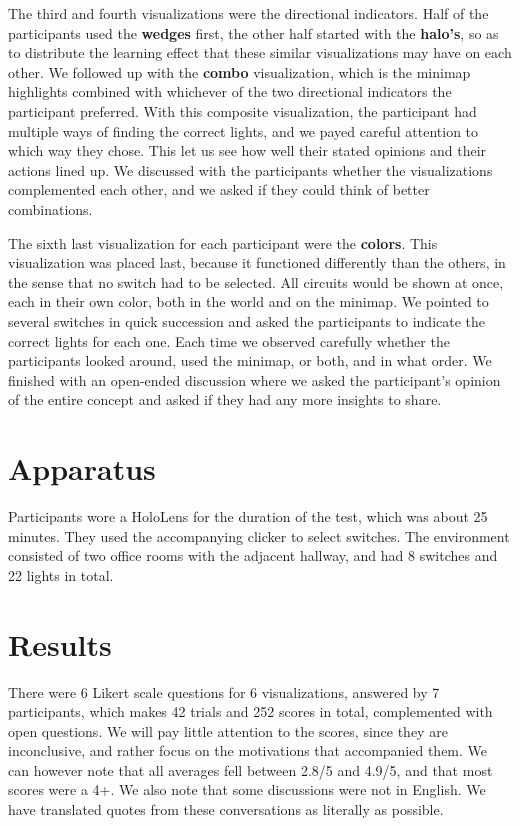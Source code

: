 The third and fourth visualizations were the directional indicators. Half of the participants used the \textbf{wedges} first, the other half started with the \textbf{halo's}, so as to distribute the learning effect that these similar visualizations may have on each other. We followed up with the \textbf{combo} visualization, which is the minimap highlights combined with whichever of the two directional indicators the participant preferred. With this composite visualization, the participant had multiple ways of finding the correct lights, and we payed careful attention to which way they chose. This let us see how well their stated opinions and their actions lined up. We discussed with the participants whether the visualizations complemented each other, and we asked if they could think of better combinations.

The sixth last visualization for each participant were the \textbf{colors}. This visualization was placed last, because it functioned differently than the others, in the sense that no switch had to be selected. All circuits would be shown at once, each in their own color, both in the world and on the minimap. We pointed to several switches in quick succession and asked the participants to indicate the correct lights for each one. Each time we observed carefully whether the participants looked around, used the minimap, or both, and in what order. We finished with an open-ended discussion where we asked the participant's opinion of the entire concept and asked if they had any more insights to share.

\section{Apparatus} \label{sec:user:survey:apparatus}
Participants wore a HoloLens for the duration of the test, which was about 25 minutes. They used the accompanying clicker to select switches. The environment consisted of two office rooms with the adjacent hallway, and had 8 switches and 22 lights in total.

\section{Results} \label{sec:user:results}
There were 6 Likert scale questions for 6 visualizations, answered by 7 participants, which makes 42 trials and 252 scores in total, complemented with open questions. We will pay little attention to the scores, since they are inconclusive, and rather focus on the motivations that accompanied them. We can however note that all averages fell between 2.8/5 and 4.9/5, and that most scores were a 4+. We also note that some discussions were not in English. We have translated quotes from these conversations as literally as possible.

